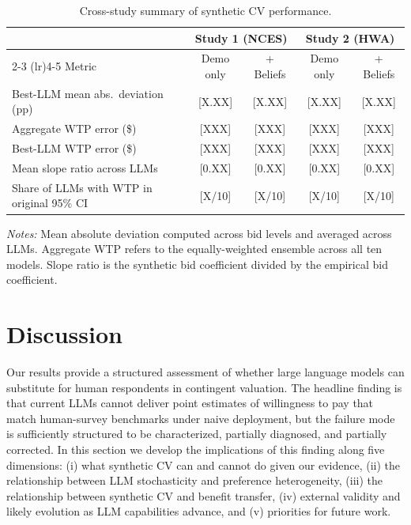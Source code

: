 \documentclass[12pt]{article}
\begin{document}
\begin{table}[h]
    \centering
    \caption{Cross-study summary of synthetic CV performance.}
    \label{tab:cross-study}
    \begin{threeparttable}
    \begin{tabular}{lcccc}
        \toprule
         & \multicolumn{2}{c}{Study 1 (NCES)} & \multicolumn{2}{c}{Study 2 (HWA)} \\
        \cmidrule(lr){2-3} \cmidrule(lr){4-5}
        Metric & Demo only & + Beliefs & Demo only & + Beliefs \\
        \midrule
        Best-LLM mean abs.\ deviation (pp)        & [X.XX] & [X.XX] & [X.XX] & [X.XX] \\
        Aggregate WTP error (\$)                  & [XXX]  & [XXX]  & [XXX]  & [XXX]  \\
        Best-LLM WTP error (\$)                   & [XXX]  & [XXX]  & [XXX]  & [XXX]  \\
        Mean slope ratio across LLMs              & [0.XX] & [0.XX] & [0.XX] & [0.XX] \\
        Share of LLMs with WTP in original 95\% CI & [X/10] & [X/10] & [X/10] & [X/10] \\
        \bottomrule
    \end{tabular}
    \begin{tablenotes}\footnotesize
    \item \textit{Notes:} Mean absolute deviation computed across bid levels and averaged across LLMs. Aggregate WTP refers to the equally-weighted ensemble across all ten models. Slope ratio is the synthetic bid coefficient divided by the empirical bid coefficient.
    \end{tablenotes}
    \end{threeparttable}
\end{table}



\section{Discussion}\label{sec:discussion}

Our results provide a structured assessment of whether large language models can substitute for human respondents in contingent valuation. The headline finding is that current LLMs cannot deliver point estimates of willingness to pay that match human-survey benchmarks under naive deployment, but the failure mode is sufficiently structured to be characterized, partially diagnosed, and partially corrected. In this section we develop the implications of this finding along five dimensions: (i) what synthetic CV can and cannot do given our evidence, (ii) the relationship between LLM stochasticity and preference heterogeneity, (iii) the relationship between synthetic CV and benefit transfer, (iv) external validity and likely evolution as LLM capabilities advance, and (v) priorities for future work.
\end{document}
